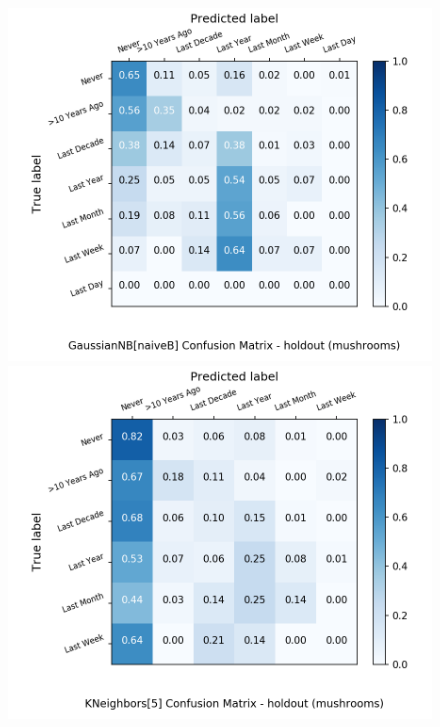 \begin{figure}[H]
\begin{minipage}[b]{0.32\textwidth}
		\includegraphics[width=1.1\textwidth]{Plots/mushrooms_GaussianNB_naiveB_balance_False_holdout.png}
	\end{minipage}
	\begin{minipage}[b]{0.32\textwidth}
		\includegraphics[width=1.1\textwidth]{Plots/mushrooms_KNeighbors_5_balance_False_holdout.png}
  \end{minipage}
	\begin{minipage}[b]{0.32\textwidth}

\end{minipage}
\end{figure}
